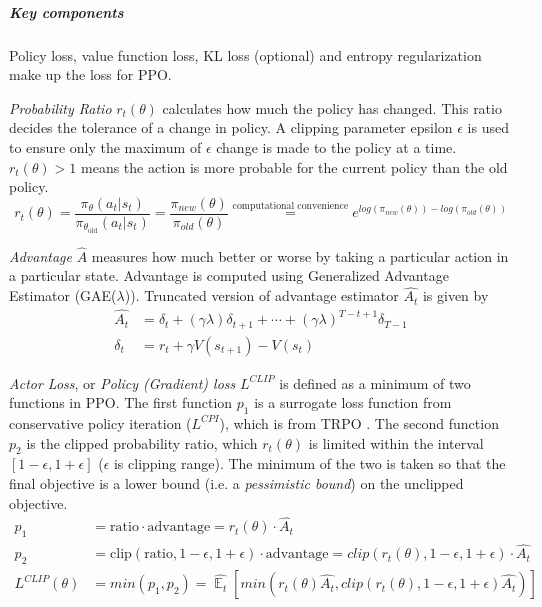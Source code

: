 \documentclass[lang=en,mode=normal,device=normal,color=blue,12pt]{elegantnote}
\DeclareMathOperator*{\1}{\mathbbm{1}}
\DeclareMathOperator*{\E}{\mathbb{E}}
\begin{document}
\subparagraph{Key components}

Policy loss, value function loss, KL loss (optional) and entropy regularization make up the loss for PPO.

\textit{Probability Ratio} $r_t(\theta)$ calculates how much the policy has changed. This ratio decides the tolerance of a change in policy. A clipping parameter epsilon $\epsilon$ is used to ensure only the maximum of $\epsilon$ change is made to the policy at a time. $r_t(\theta) > 1$ means the action is more probable for the current policy than the old policy.
\[
r_t(\theta) = \frac{\pi_{\theta} (a_t | s_t)}{\pi_{\theta_\text{old}} (a_t | s_t)} = \frac{\pi_{new}(\theta)}{\pi_{old}(\theta)} \overset{\mathrm{\text{computational convenience}}}= e^{ log(\pi_{new}(\theta)) - log(\pi_{old}(\theta)) }
\]


\textit{Advantage} $\hat{A}$ measures how much better or worse by taking a particular action in a particular state. Advantage is computed using Generalized Advantage Estimator (GAE($\lambda$)). Truncated version of advantage estimator $\hat{A_t}$ is given by
\begin{align*}
\hat{A_t} & = \delta_t + (\gamma \lambda)\delta_{t+1} + \cdots + (\gamma\lambda)^{T-t+1}\delta_{T-1} \\
\delta_t & = r_t + \gamma V(s_{t+1}) - V(s_t)
\end{align*}

\textit{Actor Loss}, or \textit{Policy (Gradient) loss} $L^{CLIP}$ is defined as a minimum of two functions in PPO. The first function $p_1$ is a surrogate loss function from conservative policy iteration ($L^{CPI}$), which is from TRPO \cite{schulman2017trust}.
The second function $p_2$ is the clipped probability ratio, which $r_t(\theta)$ is limited within the interval $[1-\epsilon, 1+\epsilon]$ ($\epsilon$ is clipping range).
The minimum of the two is taken so that the final objective is a lower bound (i.e. a \textit{pessimistic bound}) on the unclipped objective.
\begin{align*}
p_1 & = \text{ratio}\cdot\text{advantage} = r_t(\theta)\cdot\hat{A_t}\\
p_2 & = \text{clip}(\text{ratio}, 1-\epsilon, 1+\epsilon)\cdot\text{advantage} = clip(r_t(\theta), 1-\epsilon, 1+\epsilon)\cdot\hat{A_t}\\
L^{CLIP}(\theta) & = min(p_1, p_2) = \hat{\E_t}[min(r_t(\theta)\hat{A_t},clip(r_t(\theta),1-\epsilon,1+\epsilon)\hat{A_t})]
\end{align*}
\end{document}
